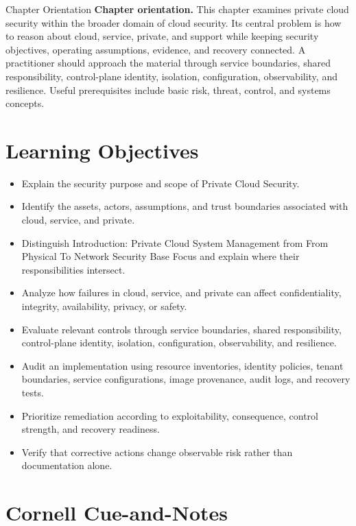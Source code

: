 \documentclass[11pt,letterpaper]{article}
\title{\CornellDocumentTitle}
\author{}
\date{}
\begin{document}
\maketitle
\begin{CornellOverviewBox}{Chapter Orientation}
\textbf{Chapter orientation.} This chapter examines private cloud security within the broader domain of cloud security. Its central problem is how to reason about cloud, service, private, and support while keeping security objectives, operating assumptions, evidence, and recovery connected. A practitioner should approach the material through service boundaries, shared responsibility, control-plane identity, isolation, configuration, observability, and resilience. Useful prerequisites include basic risk, threat, control, and systems concepts.
\end{CornellOverviewBox}
\section*{Learning Objectives}
\begin{itemize}
\item Explain the security purpose and scope of Private Cloud Security.
\item Identify the assets, actors, assumptions, and trust boundaries associated with cloud, service, and private.
\item Distinguish Introduction: Private Cloud System Management from From Physical To Network Security Base Focus and explain where their responsibilities intersect.
\item Analyze how failures in cloud, service, and private can affect confidentiality, integrity, availability, privacy, or safety.
\item Evaluate relevant controls through service boundaries, shared responsibility, control-plane identity, isolation, configuration, observability, and resilience.
\item Audit an implementation using resource inventories, identity policies, tenant boundaries, service configurations, image provenance, audit logs, and recovery tests.
\item Prioritize remediation according to exploitability, consequence, control strength, and recovery readiness.
\item Verify that corrective actions change observable risk rather than documentation alone.
\end{itemize}
\section*{Cornell Cue-and-Notes}
\end{document}
